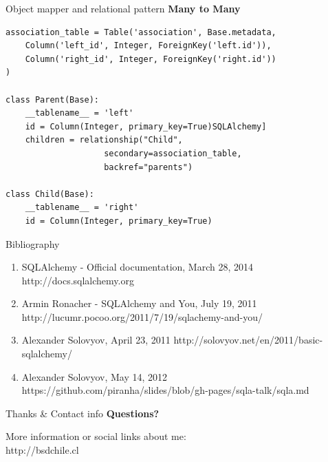 \documentclass[seagull]{beamer}
\begin{document}
\begin{frame}[fragile]{Object mapper and relational pattern}
\textbf{Many to Many}
\begin{verbatim}
association_table = Table('association', Base.metadata,
    Column('left_id', Integer, ForeignKey('left.id')),
    Column('right_id', Integer, ForeignKey('right.id'))
)

class Parent(Base):
    __tablename__ = 'left'
    id = Column(Integer, primary_key=True)SQLAlchemy]
    children = relationship("Child",
                    secondary=association_table,
                    backref="parents")

class Child(Base):
    __tablename__ = 'right'
    id = Column(Integer, primary_key=True)
\end{verbatim}
\end{frame}

\begin{frame}{Bibliography}
\begin{enumerate}
\item SQLAlchemy - Official documentation, March 28, 2014 http://docs.sqlalchemy.org
\item Armin Ronacher - SQLAlchemy and You, July 19, 2011 http://lucumr.pocoo.org/2011/7/19/sqlachemy-and-you/
\item Alexander Solovyov, April 23, 2011 http://solovyov.net/en/2011/basic-sqlalchemy/
\item Alexander Solovyov, May 14, 2012 https://github.com/piranha/slides/blob/gh-pages/sqla-talk/sqla.md
\end{enumerate}
\end{frame}

\begin{frame}{Thanks \& Contact info}
\centering\textbf{Questions?}
\\
\begin{small}
More information or social links about me:\\
http://bsdchile.cl
\end{small}
\end{frame}

\begin{frame}{}

\end{frame}
\end{document}
